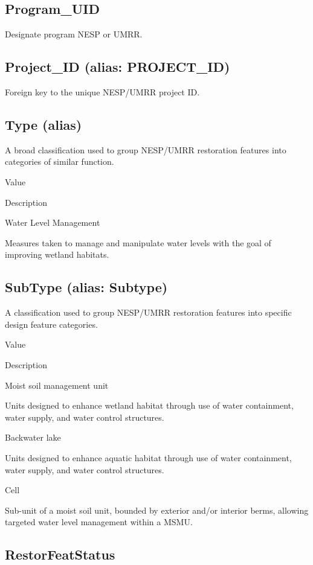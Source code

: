 \documentclass[
  letterpaper,
  DIV=11,
  numbers=noendperiod]{scrreprt}
\begin{document}
\subsection{Program\_UID}\label{program_uid-8}

Designate program NESP or UMRR.

\subsection{Project\_ID (alias:
PROJECT\_ID)}\label{project_id-alias-project_id-8}

Foreign key to the unique NESP/UMRR project ID.

\subsection{Type (alias)}\label{type-alias-7}

A broad classification used to group NESP/UMRR restoration features into
categories of similar function.

Value

Description

Water Level Management

Measures taken to manage and manipulate water levels with the goal of
improving wetland habitats.

\subsection{SubType (alias: Subtype)}\label{subtype-alias-subtype-8}

A classification used to group NESP/UMRR restoration features into
specific design feature categories.

Value

Description

Moist soil management unit

Units designed to enhance wetland habitat through use of water
containment, water supply, and water control structures.

Backwater lake

Units designed to enhance aquatic habitat through use of water
containment, water supply, and water control structures.

Cell

Sub-unit of a moist soil unit, bounded by exterior and/or interior
berms, allowing targeted water level management within a MSMU.

\subsection{RestorFeatStatus}\label{restorfeatstatus-8}
\end{document}
